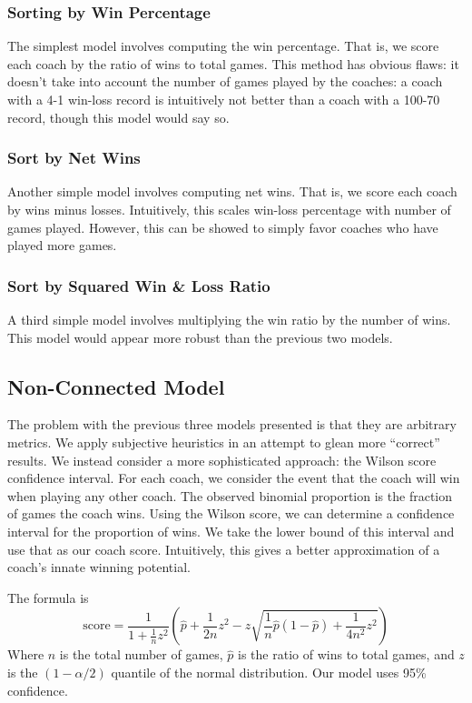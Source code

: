 \documentclass[titlepage]{article}
\begin{document}
\subsubsection{Sorting by Win Percentage}
The simplest model involves computing the win percentage. That is, we score each coach by the ratio of wins to total games. This method has obvious flaws: it doesn't take into account the number of games played by the coaches: a coach with a 4-1 win-loss record is intuitively not better than a coach with a 100-70 record, though this model would say so.

\subsubsection{Sort by Net Wins}
Another simple model involves computing net wins. That is, we score each coach by wins minus losses. Intuitively, this scales win-loss percentage with number of games played. However, this can be showed to simply favor coaches who have played more games. 

\subsubsection{Sort by Squared Win \& Loss Ratio}
A third simple model involves multiplying the win ratio by the number of wins. This model would appear more robust than the previous two models.

\subsection{Non-Connected Model}
The problem with the previous three models presented is that they are arbitrary metrics. We apply subjective heuristics in an attempt to glean more ``correct'' results. We instead consider a more sophisticated approach: the Wilson score confidence interval. For each coach, we consider the event that the coach will win when playing any other coach. The observed binomial proportion is the fraction of games the coach wins. Using the Wilson score, we can determine a confidence interval for the proportion of wins. We take the lower bound of this interval and use that as our coach score. Intuitively, this gives a better approximation of a coach's innate winning potential.

The formula is
\[ \mathrm{score} = 
  \frac{1}{1 + \frac{1}{n} z^2}
  \left(
    \hat p + \frac{1}{2n} z^2 -
    z \sqrt{
      \frac{1}{n}\hat p \left(1 - \hat p\right) +
      \frac{1}{4n^2}z^2
    } 
   \right)
\]
Where $n$ is the total number of games, $\hat{p}$ is the ratio of wins to total games, and $z$ is the $(1 - \alpha/2)$ quantile of the normal distribution. Our model uses 95\% confidence.
\end{document}
